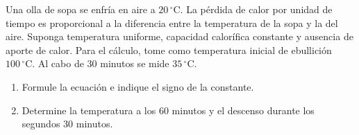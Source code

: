Una olla de sopa se enfría en aire a $20\,{}^\circ\mathrm C$. La pérdida de calor por unidad de tiempo es proporcional a la diferencia entre la temperatura de la sopa y la del aire. Suponga temperatura uniforme, capacidad calorífica constante y ausencia de aporte de calor. Para el cálculo, tome como temperatura inicial de ebullición $100\,{}^\circ\mathrm C$. Al cabo de $30$ minutos se mide $35\,{}^\circ\mathrm C$.

\begin{enumerate}[label=(\alph*),ref=\alph*,leftmargin=*]
\item Formule la ecuación e indique el signo de la constante.
\item Determine la temperatura a los $60$ minutos y el descenso durante los segundos $30$ minutos.
\end{enumerate}
